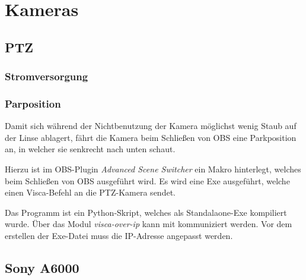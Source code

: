 \chapter{Kameras}
	\section{PTZ}
		\subsection{Stromversorgung}

		\subsection{Parposition}
			Damit sich während der Nichtbenutzung der Kamera möglichst wenig Staub auf der Linse ablagert, fährt die Kamera beim Schließen von OBS eine Parkposition an, in welcher sie senkrecht nach unten schaut.

			Hierzu ist im \Gls{OBS}-Plugin \textit{Advanced Scene Switcher} ein Makro hinterlegt, welches beim Schließen von OBS ausgeführt wird. Es wird eine Exe ausgeführt, welche einen \Gls{Visca}-Befehl an die \Gls{PTZ-Kamera} sendet.

			Das Programm ist ein Python-Skript, welches als Standalaone-Exe kompiliert wurde. Über das Modul \textit{visca-over-ip} kann mit  kommuniziert werden. Vor dem erstellen der Exe-Datei muss die IP-Adresse angepasst werden.
	\section{Sony A6000}